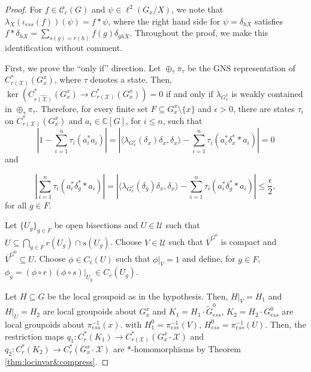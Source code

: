 \documentclass[10pt,a4paper]{amsart}
\begin{document}
\begin{proof}
 For $f\in \mathscr{C}_{c}(G)$ and $\psi\in \ell^{2}(G_{x}/X)$, we note that $\lambda_{X}(\iota_{ess}(f))(\psi) = f*\psi$, where the right hand side for $\psi = \delta_{hX}$ satisfies $f*\delta_{hX} = \sum_{s(g) = r(h)}f(g)\delta_{ghX}$. Throughout the proof, we make this identification without comment.

    First, we prove the ``only if'' direction. Let $\oplus_{\tau}\pi_{\tau}$ be the GNS representation of $C^{*}_{r(\mathcal{X})}(G^{x}_{x})$, where $\tau$ denotes a state. Then, $\ker(C^{*}_{\widehat{r(\mathcal{X})}}(G^{x}_{x})\to C^{*}_{r(\mathcal{X})}(G^{x}_{x})) = 0$ if and only if $\lambda_{G^{x}_{x}}$ is weakly contained in $\oplus_{\tau}\pi_{\tau}$. Therefore, for every finite set $F\subseteq G^{x}_{x}\setminus \{x\}$ and $\epsilon > 0$, there are states $\tau_{i}$ on $C^{*}_{r(\mathcal{X})}(G^{x}_{x})$ and $a_{i}\in\mathbb{C}[G]$, for $i\leq n$, such that $$| 1 - \sum^{n}_{i=1}\tau_{i}(a^{*}_{i}a_{i})| = |\langle\lambda_{G^{x}_{x}}(\delta_{x})\delta_{x}, \delta_{x}\rangle - \sum^{n}_{i=1}\tau_{i}(a^{*}_{i} \delta^{*}_{x}*a_{i})| = 0$$ and

    \begin{equation}
    \label{eq:wkequivalence1}
        | \sum^{n}_{i = 1}\tau_{i}(a^{*}_{i}\delta^{*}_{g} * a_{i})| = |\langle \lambda_{G^{x}_{x}}(\delta_{g})\delta_{x},\delta_{x}\rangle - \sum^{n}_{i = 1}\tau_{i}(a^{*}_{i}\delta^{*}_{g}* a_{i})|\leq \frac{\epsilon}{2},
    \end{equation}
for all $g\in F$.

Let $\{U_{g}\}_{g\in F}$ be open bisections and $U\in\mathcal{U}$ such that $U\subseteq \bigcap_{g\in F} r(U_{g})\cap s(U_{g})$. Choose $V\in\mathcal{U}$ such that $\overline{V}^{G^{0}}$ is compact and $\overline{V}^{G^{0}}\subseteq U$. Choose $\phi\in C_{c}(U)$ such that $\phi|_{V} = 1$ and define, for $g\in F$, $\phi_{g} = (\phi\circ r)(\phi\circ s)|_{U_{g}}\in C_{c}(U_{g})$.

Let $H\subseteq G$ be the local groupoid as in the hypothesis. Then, $H|_{V} = H_{1}$ and $H|_{U} = H_{2}$ are local groupoids about $G^{x}_{x}$ and $K_{1} = H_{1}\cdot\tilde{G}_{ess}^{0}$, $K_{2} = H_{2}\cdot G^{0}_{ess}$ are local groupoids about $\pi_{ess}^{-1}(x)$. with $H^{0}_{1} = \pi_{ess}^{-1}(V)$, $H^{0}_{ess} = \pi^{-1}_{ess}(U)$. Then, the restriction maps $q_{1}:C^{*}_{r}(K_{1})\to C^{*}_{r(\mathcal{X})}(G^{x}_{x}\cdot \mathcal{X})$ and $q_{2}:C^{*}_{r}(K_{2})\to C^{*}_{r}(G^{x}_{x}\cdot\mathcal{X})$ are *-homomorphisms by Theorem \ref{thm:locinvar&compress}.


\end{proof}
\end{document}
